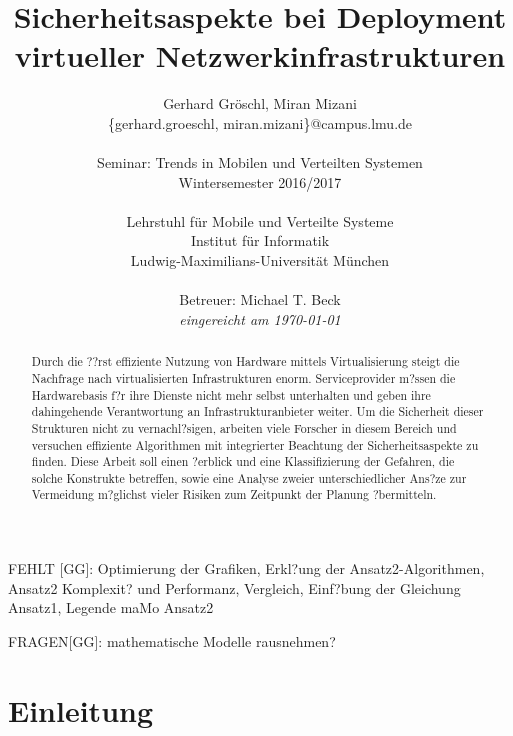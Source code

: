 \documentclass{lni}
\author{Gerhard Gröschl, Miran Mizani\\\{gerhard.groeschl, miran.mizani\}@campus.lmu.de\\\\
Seminar: Trends in Mobilen und Verteilten Systemen \\Wintersemester 2016/2017\\\\
Lehrstuhl für Mobile und Verteilte Systeme\\Institut für Informatik\\Ludwig-Maximilians-Universität München\\\\
Betreuer: Michael T. Beck\\\textit{eingereicht am \today}}
\title{Sicherheitsaspekte bei Deployment virtueller Netzwerkinfrastrukturen}
\begin{document}
\maketitle

\vfill
FEHLT [GG]: Optimierung der Grafiken, Erkl?ung der Ansatz2-Algorithmen, Ansatz2 Komplexit? und Performanz, Vergleich, Einf?bung der Gleichung Ansatz1, Legende maMo Ansatz2

FRAGEN[GG]: mathematische Modelle rausnehmen?

\begin{abstract}
Durch die ??rst effiziente Nutzung von Hardware mittels Virtualisierung steigt die Nachfrage nach virtualisierten Infrastrukturen enorm. Serviceprovider m?ssen die Hardwarebasis f?r ihre Dienste nicht mehr selbst unterhalten und geben ihre dahingehende Verantwortung an Infrastrukturanbieter weiter. Um die Sicherheit dieser Strukturen nicht zu vernachl?sigen, arbeiten viele Forscher in diesem Bereich und versuchen effiziente Algorithmen mit integrierter Beachtung der Sicherheitsaspekte zu finden. Diese Arbeit soll einen ?erblick und eine Klassifizierung der Gefahren, die solche Konstrukte betreffen, sowie eine Analyse zweier unterschiedlicher Ans?ze zur Vermeidung m?glichst vieler Risiken zum Zeitpunkt der Planung ?bermitteln.
\end{abstract}


\newpage
\tableofcontents
\newpage

\section{Einleitung}
\label{sec:Einleitung}





\end{document}
